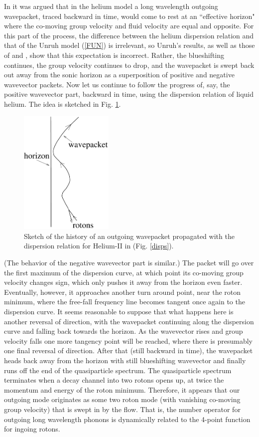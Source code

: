 \documentclass[12pt]{article}
\begin{document}
In \cite{Jaco1} it was argued that in the helium model a long
wavelength outgoing wavepacket, traced backward in time, would come to
rest at an ``effective horizon" where the co-moving group velocity and
fluid velocity are equal and opposite. For this part of the process,
the difference between the helium dispersion relation and that of the
Unruh model (\ref{FUN}) is irrelevant, so Unruh's results\cite{Unruh2},
as well as those of \cite{BMPS} and \cite{CorlJaco}, show that this
expectation is incorrect. Rather, the blueshifting continues, the group
velocity continues to drop, and the wavepacket is swept back out away
from the sonic horizon as a superposition of positive and negative
wavevector packets. Now let us continue to follow the progress of, say,
the positive wavevector part, backward in time, using the dispersion
relation of liquid helium.  The idea is sketched in Fig. \ref{dance}.
\begin{figure}[tb]
\centerline{
\includegraphics[height=6cm, keepaspectratio]{dance-copy.pdf} 
}
\caption{Sketch of the history of an outgoing wavepacket
propagated with the dispersion relation for Helium-II in (Fig. \ref{disps}).}
\label{dance}
\end{figure}
(The behavior of the negative wavevector part is similar.) The packet
will go over the first maximum of the dispersion curve, at which point
its co-moving group velocity changes sign, which only pushes it away
from the horizon even faster.  Eventually, however, it approaches
another turn around point, near the roton minimum, where the free-fall
frequency line becomes tangent once again to the dispersion curve. It
seems reasonable to suppose that what happens here is another reversal
of direction, with the wavepacket continuing along the dispersion curve
and falling back towards the horizon. As the wavevector rises and group
velocity falls one more tangency point will be reached, where there is
presumably one final reversal of direction. After that (still backward
in time), the wavepacket heads back away from the horizon with still
blueshifting wavevector and finally runs off the end of the
quasiparticle spectrum.  The quasiparticle spectrum terminates when a
decay channel into two rotons opens up, at twice the momentum and
energy of the roton minimum\cite{Pita59,Khal}.  Therefore, it appears
that our outgoing mode originates as some two roton mode (with
vanishing co-moving group velocity) that is swept in by the flow. That
is, the number operator for outgoing long wavelength phonons is
dynamically related to the 4-point function for ingoing rotons.
\end{document}
